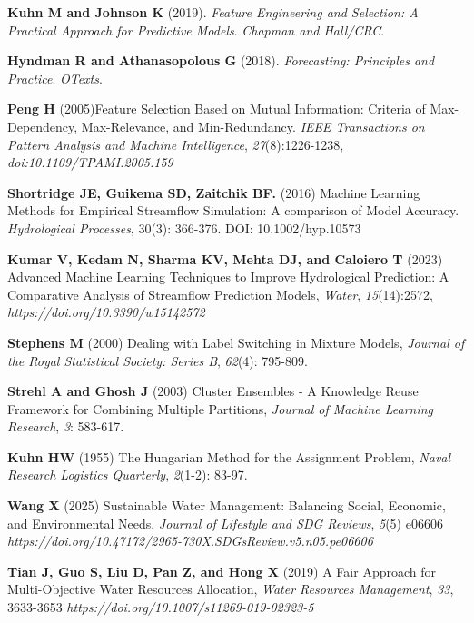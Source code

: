 \documentclass[ruler]{CUP-JNL-EDS}%
\begin{document}
\begin{Backmatter}
\begin{thebibliography}{}
\textbf{Kuhn M and Johnson K} (2019). \textit{Feature Engineering and Selection: A Practical Approach for Predictive Models}. \textit{Chapman and Hall/CRC}.

\textbf{Hyndman R and Athanasopolous G} (2018). \textit{Forecasting: Principles and Practice}. \textit{OTexts}.

\textbf{Peng H} (2005)Feature Selection Based on Mutual Information: Criteria of Max-Dependency, Max-Relevance, and Min-Redundancy. \textit{IEEE Transactions on Pattern Analysis and Machine Intelligence}, \textit{27}(8):1226-1238, \textit{doi:10.1109/TPAMI.2005.159}

\textbf{Shortridge JE, Guikema SD, Zaitchik BF.} (2016) Machine Learning Methods for Empirical Streamflow Simulation: A comparison of Model Accuracy. \textit{Hydrological Processes}, 30(3): 366-376. DOI: 10.1002/hyp.10573

\textbf{Kumar V, Kedam N, Sharma KV, Mehta DJ, and Caloiero T} (2023) Advanced Machine Learning Techniques to Improve Hydrological Prediction: A Comparative Analysis of Streamflow Prediction Models, \textit{Water}, \textit{15}(14):2572, \textit{https://doi.org/10.3390/w15142572}

\textbf{Stephens M} (2000) Dealing with Label Switching in Mixture Models, \textit{Journal of the Royal Statistical Society: Series B}, \textit{62}(4): 795-809.

\textbf{Strehl A and Ghosh J} (2003) Cluster Ensembles - A Knowledge Reuse Framework for Combining Multiple Partitions, \textit{Journal of Machine Learning Research}, \textit{3}: 583-617.

\textbf{Kuhn HW} (1955) The Hungarian Method for the Assignment Problem, \textit{Naval Research Logistics Quarterly}, \textit{2}(1-2): 83-97.

\textbf{Wang X} (2025) Sustainable Water Management: Balancing Social, Economic, and Environmental Needs. \textit{Journal of Lifestyle and SDG Reviews}, \textit{5}(5) e06606 \textit{https://doi.org/10.47172/2965-730X.SDGsReview.v5.n05.pe06606}

\bibitem[Tian et al., 2019][tian2019]
\textbf{Tian J, Guo S, Liu D, Pan Z, and Hong X} (2019) A Fair Approach for Multi-Objective Water Resources Allocation, \textit{Water Resources Management}, \textit{33}, 3633-3653 \textit{https://doi.org/10.1007/s11269-019-02323-5}


\end{thebibliography}
\end{Backmatter}
\end{document}

